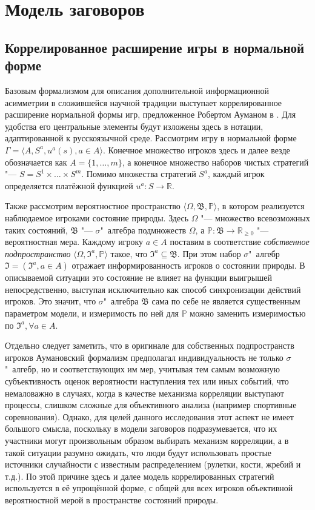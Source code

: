 \chapter{Модель заговоров}\label{ch:ch1}

\section{Коррелированное расширение игры в нормальной форме}\label{sec:ch1/sec1}

Базовым формализмом для описания дополнительной информационной асимметрии в сложившейся научной традиции выступает коррелированное расширение нормальной формы игр, предложенное Робертом Ауманом в \cite{Aumann74}. Для удобства его центральные элементы будут изложены здесь в нотации, адаптированной к русскоязычной среде. Рассмотрим игру в нормальной форме $\Gamma = \langle A, S^a, u^a(s), a \in A \rangle$. Конечное множество игроков здесь и далее везде обозначается как $A = \{1, \ldots, m\}$, а конечное множество наборов чистых стратегий "--- $S = S^1 \times \ldots \times S^m$. Помимо множества стратегий $S^a$, каждый игрок определяется платёжной функцией $u^a : S \rightarrow \mathbb{R}$.

Также рассмотрим вероятностное пространство\cite{Kolmogorov} $\langle \Omega, \mathfrak{B}, \mathbb{P} \rangle$, в котором реализуется наблюдаемое игроками состояние природы. Здесь $\Omega$ "--- множество всевозможных таких состояний, $\mathfrak{B}$ "--- $\sigma$"~алгебра подмножеств $\Omega$, а $\mathbb{P} : \mathfrak{B} \rightarrow \mathbb{R}_{\ge 0}$ "--- вероятностная мера. Каждому игроку $a \in A$ поставим в соответствие \emph{собственное подпространство} $\langle \Omega, \mathfrak{I}^a, \mathbb{P} \rangle$ такое, что $\mathfrak{I}^a \subseteq \mathfrak{B}$. При этом набор $\sigma$"~алгебр $\mathfrak{I} = (\mathfrak{I}^a, a \in A)$ отражает информированность игроков о состоянии природы. В описываемой ситуации это состояние не влияет на функции выигрышей непосредственно, выступая исключительно как способ синхронизации действий игроков. Это значит, что $\sigma$"~алгебра $\mathfrak{B}$ сама по себе не является существенным параметром модели, и измеримость по ней для $\mathbb{P}$ можно заменить измеримостью по $\mathfrak{I}^a, \forall a \in A$.

Отдельно следует заметить, что в оригинале для собственных подпространств игроков Аумановский формализм предполагал индивидуальность не только $\sigma$"~алгебр, но и соответствующих им мер, учитывая тем самым возможную субъективность оценок вероятности наступления тех или иных событий, что немаловажно в случаях, когда в качестве механизма корреляции выступают процессы, слишком сложные для объективного анализа (например спортивные соревнования). Однако, для целей данного исследования этот аспект не имеет большого смысла, поскольку в модели заговоров подразумевается, что их участники могут произвольным образом выбирать механизм корреляции, а в такой ситуации разумно ожидать, что люди будут использовать простые источники случайности с известным распределением (рулетки, кости, жребий и т.д.). По этой причине здесь и далее модель коррелированных стратегий используется в её упрощённой форме, с общей для всех игроков объективной вероятностной мерой в пространстве состояний природы.


